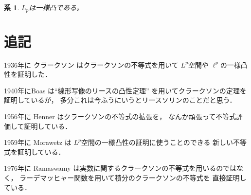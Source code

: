 \documentclass[leqno]{jsarticle}
\newtheorem{cor}[thm]{系}
\begin{document}
\begin{cor}
$L_p$は一様凸である。
\end{cor}

\section{追記}

1936年に
クラークソン
\cite{MR1501880}
はクラークソンの不等式を用いて
$L^{p}$空間や
$\ell^{p}$の一様凸性を証明した．

1940年にBoas
\cite{MR0001456}
は``線形写像のリースの凸性定理''
を用いてクラークソンの定理を証明しているが，
多分これは今ふうにいうとリースソリンのことだと思う．

1956年に
Henner
\cite{MR0077087}
はクラークソンの不等式の拡張を，
なんか頑張って不等式評価して証明している．


1959年に
Morawetz
\cite{MR0256149}
は
$L^{p}$空間の一様凸性の証明に使うことのできる
新しい不等式を証明している．


1976年に
Ramaswamy
\cite{MR0492135}
は実数に関するクラークソンの不等式を用いるのではなく，
ラーデマッヒャー関数を用いて積分のクラークソンの不等式を
直接証明している．


\nocite{*}





	

			
\end{document}
